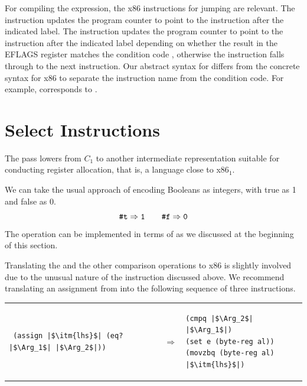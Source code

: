 \documentclass[11pt]{book}
\begin{document}
For compiling the  expression, the x86 instructions for
jumping are relevant. The  instruction updates the program
counter to point to the instruction after the indicated label.  The
 instruction updates the program counter to point to the
instruction after the indicated label depending on whether the result
in the EFLAGS register matches the condition code , otherwise
the  instruction falls through to the next
instruction. Our abstract syntax for  differs from the
concrete syntax for x86 to separate the instruction name from the
condition code. For example,  corresponds to
.

\section{Select Instructions}
\label{sec:select-r2}

The  pass lowers from $C_1$ to another
intermediate representation suitable for conducting register
allocation, that is, a language close to x86$_1$.

We can take the usual approach of encoding Booleans as integers, with
true as 1 and false as 0.
\[
\texttt{\#t} \Rightarrow \texttt{1}
\qquad
\texttt{\#f} \Rightarrow \texttt{0}
\]
The  operation can be implemented in terms of 
as we discussed at the beginning of this section.

Translating the  and the other comparison operations to x86
is slightly involved due to the unusual nature of the 
instruction discussed above.  We recommend translating an assignment
from  into the following sequence of three instructions. \\
\begin{tabular}{lll}
\begin{minipage}{0.4\textwidth}
\begin{lstlisting}
 (assign |$\itm{lhs}$| (eq? |$\Arg_1$| |$\Arg_2$|))
\end{lstlisting}
\end{minipage}
&
$\Rightarrow$
&
\begin{minipage}{0.4\textwidth}
\begin{lstlisting}
(cmpq |$\Arg_2$| |$\Arg_1$|)
(set e (byte-reg al))
(movzbq (byte-reg al) |$\itm{lhs}$|)
\end{lstlisting}
\end{minipage}
\end{tabular}  \\
\end{document}
